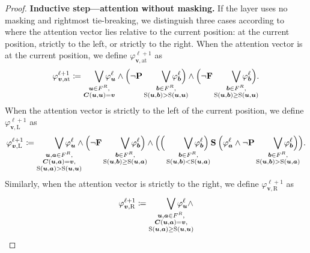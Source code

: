 \documentclass{article} %
\newcommand{\score}{\mathrm{S}}
\newcommand{\opbf}[1]{\textnormal{\textbf{#1}}}
\newcommand{\past}{\opbf{P}}
\newcommand{\future}{\opbf{F}}
\newcommand{\since}{\mathbin{\opbf{S}}}
\newcommand{\matC}{\boldsymbol{C}}
\newcommand{\vecb}{\boldsymbol{b}}
\newcommand{\veca}{\boldsymbol{a}}
\newcommand{\bnfdef}{\coloneqq}
\newcommand{\bv}{\boldsymbol{v}}
\newcommand{\bu}{\boldsymbol{u}}
\begin{document}
\begin{proof}
\medskip\noindent\textbf{Inductive step---attention without masking.}\quad
If the layer uses no masking and rightmost tie-breaking, we distinguish three cases according to where the attention vector lies relative to the current position: at the current position, strictly to the left, or strictly to the right.
When the attention vector is at the current position, we define $\varphi_{\bv,\text{at}}^{\ell+1}$ as
\begin{equation}\label{eq:no-masking1}
\varphi_{\bv,\text{at}}^{\ell+1} \bnfdef \smashoperator[r]{\bigvee_{\substack{\bu \in F^R, \\ \matC(\bu, \bu) = \bv}}} \varphi_{\bu}^\ell \wedge
\Big(\neg\past\smashoperator[r]{\bigvee_{\substack{\vecb \in F^R, \\ \score(\bu, \vecb) > \score(\bu, \bu)}}}
\varphi_{\vecb}^\ell\Big) \wedge
\Big(\neg\future\smashoperator[r]{\bigvee_{\substack{\vecb \in F^R, \\ \score(\bu, \vecb) \ge \score(\bu, \bu)}}}
\varphi_{\vecb}^\ell\Big).
\end{equation}
When the attention vector is strictly to the left of the current position, we define $\varphi_{\bv,\text{L}}^{\ell+1}$ as
\begin{equation}\label{eq:no-masking2}
\varphi_{\bv,\text{L}}^{\ell+1} \bnfdef \smashoperator[r]{\bigvee_{\substack{\bu, \veca \in F^R, \\ \matC(\bu, \veca) = \bv, \\ \score(\bu, \veca) > \score(\bu, \bu)}}} \varphi_{\bu}^\ell \wedge
\Big(\neg\future\smashoperator[r]{\bigvee_{\substack{\vecb \in F^R, \\ \score(\bu, \vecb) \ge \score(\bu, \veca)}}}
\varphi_{\vecb}^\ell\Big) \\ \wedge
\Big(\Big(\smashoperator[r]{\bigvee_{\substack{\vecb \in F^R, \\ \score(\bu, \vecb) < \score(\bu, \veca)}}} \varphi_{\vecb}^\ell\Big) \since
\Big(\varphi_{\veca}^\ell \wedge \neg\past \smashoperator[r]{\bigvee_{\substack{\vecb \in F^R, \\ \score(\bu, \vecb) > \score(\bu, \veca)}}}
\varphi_{\vecb}^\ell\Big)\Big).
\end{equation}
Similarly, when the attention vector is strictly to the right, we define $\varphi_{\bv,\text{R}}^{\ell+1}$ as
\begin{equation}\label{eq:no-masking3}
\varphi_{\bv,\text{R}}^{\ell+1} \bnfdef \smashoperator[r]{\bigvee_{\substack{\bu, \veca \in F^R, \\ \matC(\bu, \veca) = \bv, \\ \score(\bu, \veca) \ge \score(\bu, \bu)}}} \varphi_{\bu}^\ell \wedge

\end{equation}
\end{proof}
\end{document}
